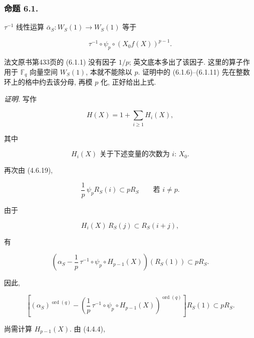 \subsubsection*{命题 6.1.}
$\tau^{-1}$ 线性运算 $\bar\alpha_S:W_S(1)\to W_S(1)$ 等于

\begin{equation}\tag{6.1.1}
\tau^{-1}\circ\psi_p\circ(X_0f(X))^{p-1}.
\end{equation}

\begin{editorialnote}
法文原书第433页的 (6.1.1) 没有因子 $1/p$; 英文底本多出了该因子.
这里的算子作用于 $\mathbb F_q$ 向量空间 $W_S(1)$, 本就不能除以 $p$.
证明中的 (6.1.6)--(6.1.11) 先在整数环上的格中约去该分母, 再模 $p$ 化, 正好给出上式.
\end{editorialnote}

\noindent\emph{证明.}
写作

\begin{equation}\tag{6.1.2}
H(X)=1+\sum_{i\geq1}H_i(X),
\end{equation}

其中

\begin{equation}\tag{6.1.3}
H_i(X)\text{ 关于下述变量的次数为 $i$: }X_0.
\end{equation}

再次由 (4.6.19),

\begin{equation}\tag{6.1.4}
\frac1p\,\psi_pR_S(i)\subset pR_S
\qquad\text{若 }i\ne p.
\end{equation}

由于

\begin{equation}\tag{6.1.5}
H_i(X)\,R_S(j)\subset R_S(i+j),
\end{equation}

有

\begin{equation}\tag{6.1.6}
\left(
\alpha_S-\frac1p\,\tau^{-1}\circ\psi_p\circ H_{p-1}(X)
\right)(R_S(1))
\subset pR_S.
\end{equation}

因此,

\begin{equation}\tag{6.1.7}
\left[
(\alpha_S)^{\operatorname{ord}(q)}
-
\left(
\frac1p\,\tau^{-1}\circ\psi_p\circ H_{p-1}(X)
\right)^{\operatorname{ord}(q)}
\right]R_S(1)
\subset pR_S.
\end{equation}

尚需计算 $H_{p-1}(X)$. 由 (4.4.4),

